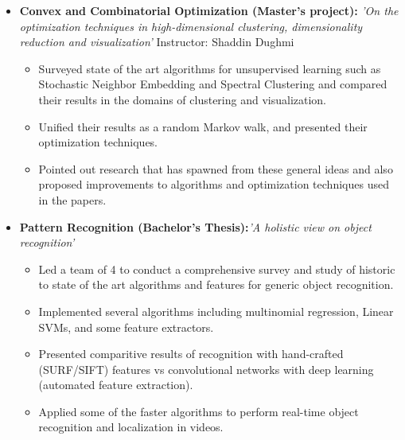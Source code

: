 \documentclass[10pt,letterpaper,sans]{moderncv}        %
\begin{document}
\begin{itemize}

\item{\textbf{Convex and Combinatorial Optimization (Master's project):} \textit{'On the optimization techniques in high-dimensional
clustering, dimensionality reduction and visualization'}
Instructor: Shaddin Dughmi
\vspace{1pt}

\small{
\begin{itemize}
\item Surveyed state of the art algorithms for unsupervised learning such as Stochastic Neighbor Embedding and Spectral Clustering and compared their results in the domains of clustering and visualization.
\item Unified their results as a random Markov walk, and presented their optimization techniques.
\item Pointed out research that has spawned from these general ideas and also proposed improvements to algorithms and optimization techniques used in the papers.
\end{itemize}}}

\item{\textbf{Pattern Recognition (Bachelor's Thesis):}\textit{'A holistic view on object recognition'}
\vspace{1pt}
\small{
\begin{itemize}
\item Led a team of 4 to conduct a comprehensive survey and study of historic to state of the art algorithms and features for generic object recognition.
\item Implemented several algorithms including multinomial regression, Linear SVMs, and some feature extractors.
\item Presented comparitive results of recognition with hand-crafted (SURF/SIFT) features vs convolutional networks with deep learning (automated feature extraction).
\item Applied some of the faster algorithms to perform real-time object recognition and localization in videos.
\end{itemize}
}
}

\end{itemize}
\end{document}
